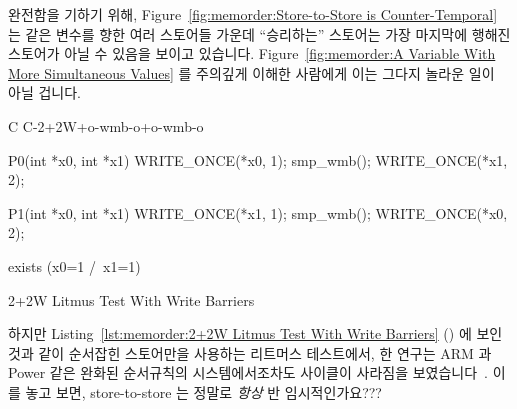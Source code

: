 완전함을 기하기 위해,
Figure~\ref{fig:memorder:Store-to-Store is Counter-Temporal}
는 같은 변수를 향한 여러 스토어들 가운데 ``승리하는'' 스토어는 가장 마지막에
행해진 스토어가 아닐 수 있음을 보이고 있습니다.
Figure~\ref{fig:memorder:A Variable With More Simultaneous Values} 를 주의깊게
이해한 사람에게 이는 그다지 놀라운 일이 아닐 겁니다.

\begin{listing}[tbp]
{ \scriptsize
\begin{verbbox}[\LstLineNo]
C C-2+2W+o-wmb-o+o-wmb-o
{
}

P0(int *x0, int *x1)
{
  WRITE_ONCE(*x0, 1);
  smp_wmb();
  WRITE_ONCE(*x1, 2);
}


P1(int *x0, int *x1)
{
  WRITE_ONCE(*x1, 1);
  smp_wmb();
  WRITE_ONCE(*x0, 2);
}

exists (x0=1 /\ x1=1)
\end{verbbox}
}
\centering
\theverbbox
\caption{2+2W Litmus Test With Write Barriers}
\label{lst:memorder:2+2W Litmus Test With Write Barriers}
\end{listing}

\QuickQuiz{}
	하지만
	Listing~\ref{lst:memorder:2+2W Litmus Test With Write Barriers}
	() 에 보인 것과 같이 순서잡힌
	스토어만을 사용하는 리트머스 테스트에서, 한 연구는 ARM 과 Power 같은
	완화된 순서규칙의 시스템에서조차도 사이클이 사라짐을
	보였습니다~\cite{test6-pdf}.
	이를 놓고 보면, store-to-store 는 정말로 \emph{항상} 반 임시적인가요???
	\iffalse

